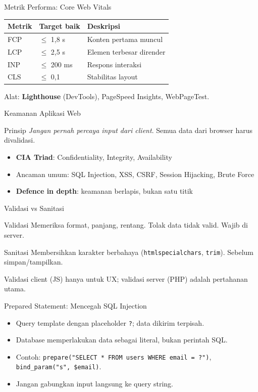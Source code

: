 \documentclass[handout]{beamer}
\begin{document}
\begin{frame}{Metrik Performa: Core Web Vitals}
	\begin{tabular}{|l|l|l|}
		\hline
		\textbf{Metrik} & \textbf{Target baik} & \textbf{Deskripsi} \\
		\hline
		FCP & $\leq$ 1,8 s & Konten pertama muncul \\
		\hline
		LCP & $\leq$ 2,5 s & Elemen terbesar dirender \\
		\hline
		INP & $\leq$ 200 ms & Respons interaksi \\
		\hline
		CLS & $\leq$ 0,1 & Stabilitas layout \\
		\hline
	\end{tabular}
	\vspace{0.5em}
	Alat: \textbf{Lighthouse} (DevTools), PageSpeed Insights, WebPageTest.
\end{frame}

\begin{frame}{Keamanan Aplikasi Web}
	\begin{block}{Prinsip}
		\textit{Jangan pernah percaya input dari client}. Semua data dari browser harus divalidasi.
	\end{block}
	\begin{itemize}
		\item \textbf{CIA Triad}: Confidentiality, Integrity, Availability
		\item Ancaman umum: SQL Injection, XSS, CSRF, Session Hijacking, Brute Force
		\item \textbf{Defence in depth}: keamanan berlapis, bukan satu titik
	\end{itemize}
\end{frame}

\begin{frame}{Validasi vs Sanitasi}
	\begin{block}{Validasi}
		Memeriksa format, panjang, rentang. Tolak data tidak valid. Wajib di server.
	\end{block}
	\begin{block}{Sanitasi}
		Membersihkan karakter berbahaya (\texttt{htmlspecialchars}, \texttt{trim}). Sebelum simpan/tampilkan.
	\end{block}
	Validasi client (JS) hanya untuk UX; validasi server (PHP) adalah pertahanan utama.
\end{frame}

\begin{frame}{Prepared Statement: Mencegah SQL Injection}
	\begin{itemize}
		\item Query template dengan placeholder \texttt{?}; data dikirim terpisah.
		\item Database memperlakukan data sebagai literal, bukan perintah SQL.
		\item Contoh: \texttt{prepare("SELECT * FROM users WHERE email = ?")}, \texttt{bind\_param("s", \$email)}.
		\item Jangan gabungkan input langsung ke query string.
	\end{itemize}
\end{frame}
\end{document}
